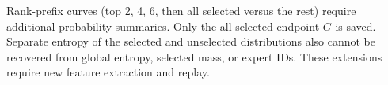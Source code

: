 Rank-prefix curves (top 2, 4, 6, then all selected versus
the rest) require additional probability summaries. Only the all-selected endpoint $G$ is saved. Separate entropy
of the selected and unselected distributions also cannot be recovered
from global entropy, selected mass, or expert IDs. These extensions
require new feature extraction and replay.
